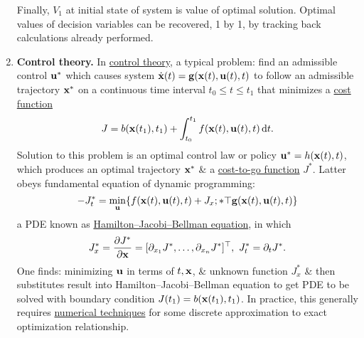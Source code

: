 \documentclass{article}
\begin{document}
\begin{enumerate}
	Finally, $V_1$ at initial state of system is value of optimal solution. Optimal values of decision variables can be recovered, 1 by 1, by tracking back calculations already performed.
	\item {\bf Control theory.} In \href{https://en.wikipedia.org/wiki/Control_theory}{control theory}, a typical problem: find an admissible control ${\bf u}^*$ which causes system $\dot{\bf x}(t) = {\bf g}({\bf x}(t),{\bf u}(t),t)$ to follow an admissible trajectory ${\bf x}^*$ on a continuous time interval $t_0\le t\le t_1$ that minimizes a \href{https://en.wikipedia.org/wiki/Loss_function}{cost function}
	\begin{equation*}
		J = b({\bf x}(t_1),t_1) + \int_{t_0}^{t_1} f({\bf x}(t),{\bf u}(t),t)\,{\rm d}t.
	\end{equation*}
	Solution to this problem is an optimal control law or policy ${\bf u}^* = h({\bf x}(t),t)$, which produces an optimal trajectory ${\bf x}^*$ \& a \href{https://en.wikipedia.org/wiki/Cost-to-go_function}{cost-to-go function} $J^*$. Latter obeys fundamental equation of dynamic programming:
	\begin{equation*}
		-J_t^* = \min_{\bf u} \{f({\bf x}(t),{\bf u}(t),t) + {J_x^^{*\top}{\bf g}({\bf x}(t),{\bf u}(t),t)\}
	\end{equation*}
	a PDE known as \href{https://en.wikipedia.org/wiki/Hamilton%E2%80%93Jacobi%E2%80%93Bellman_equation}{Hamilton--Jacobi--Bellman equation}, in which
	\begin{equation*}
		J_x^* = \frac{\partial J^*}{\partial{\bf x}} = [\partial_{x_1}J^*,\ldots,\partial_{x_n}J^*]^\top,\ J_t^* = \partial_tJ^*.
	\end{equation*}
	One finds: minimizing ${\bf u}$ in terms of $t,{\bf x}$, \& unknown function $J_x^*$ \& then substitutes result into Hamilton--Jacobi--Bellman equation to get PDE to be solved with boundary condition $J(t_1) = b({\bf x}(t_1),t_1)$. In practice, this generally requires \href{https://en.wikipedia.org/wiki/Numerical_partial_differential_equations}{numerical techniques} for some discrete approximation to exact optimization relationship.
	

\end{enumerate}
\end{document}
